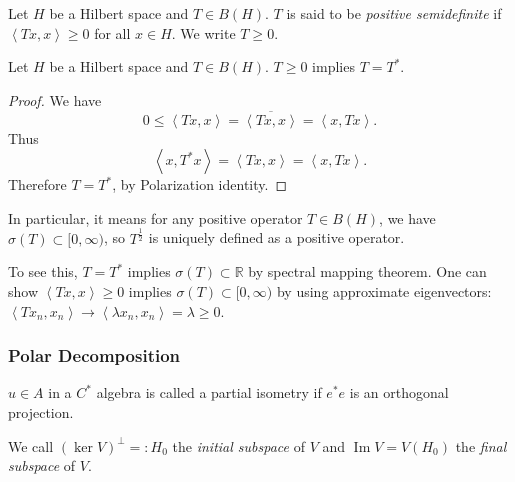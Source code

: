 \begin{definition}
	\label{defn:PositiveOperator}
	Let $H$ be a Hilbert space and $T \in B(H)$. $T$ is said to be \textit{positive semidefinite} if $\left\langle Tx, x \right\rangle \ge 0$ for all $x \in H$. We write $T \ge 0$.
\end{definition}

\begin{proposition}
	\label{prop:PositiveSA}
	Let $H$ be a Hilbert space and $T \in B(H)$. $T \ge 0$ implies $T = T^*$.
\end{proposition}
\begin{proof}
	We have
	\[
		0 \le \left\langle Tx, x \right\rangle  = \overline{\left\langle Tx,x \right\rangle }  = \left\langle x, T x \right\rangle 
	.\] 
	Thus
	\[
		\left\langle x, T^* x \right\rangle  = \left\langle Tx, x \right\rangle  = \left\langle x, T x \right\rangle 
	.\] 
	Therefore $T = T^*$, by Polarization identity.
\end{proof}



\begin{remark}
	In particular, it means for any positive operator $T \in B(H)$, we have $\sigma(T) \subset [0,\infty )$, so $T^{\frac{1}{2}}$ is uniquely defined as a positive operator. 

	To see this, $T = T^*$ implies $\sigma(T) \subset \mathbb{R}$ by spectral mapping theorem. One can show $\left\langle T x, x \right\rangle \ge 0$ implies $\sigma(T) \subset [0,\infty )$ by using approximate eigenvectors: $\left\langle T x_n, x_n \right\rangle  \to \left\langle \lambda x_n , x_n \right\rangle= \lambda \ge 0 $.
\end{remark}

\subsubsection{Polar Decomposition}

\begin{definition}
	\label{defn:PartialIsometry}
	$u \in A$ in a $C^*$ algebra is called a partial isometry if $e^* e$ is an orthogonal projection.
\end{definition}

We call $(\operatorname{ker} V)^\perp =:H_0$ the \textit{initial subspace} of $V$ and  $\operatorname{Im} V = V(H_0)$ the \textit{final subspace} of $V$.

